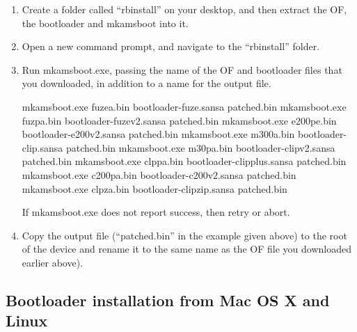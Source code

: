 \begin{enumerate}

\item Create a folder called ``rbinstall'' on your desktop, and then extract
  the OF, the bootloader and mkamsboot into it.

\item Open a new command prompt, and navigate to the ``rbinstall'' folder.

\item Run mkamsboot.exe, passing the name of the OF and bootloader files that
  you downloaded, in addition to a name for the output file.

  \begin{code}[firstline=\opt{fuze}{1}\opt{fuzev2}{2}\opt{e200v2}{3}%
            \opt{clipv1}{4}\opt{clipv2}{5}\opt{clipplus}{6}\opt{c200v2}{7}%
            \opt{clipzip}{8},%
               lastline=\opt{fuze}{1}\opt{fuzev2}{2}\opt{e200v2}{3}%
            \opt{clipv1}{4}\opt{clipv2}{5}\opt{clipplus}{6}\opt{c200v2}{7}%
            \opt{clipzip}{8}]
    mkamsboot.exe fuzea.bin bootloader-fuze.sansa patched.bin
    mkamsboot.exe fuzpa.bin bootloader-fuzev2.sansa patched.bin
    mkamsboot.exe e200pe.bin bootloader-e200v2.sansa patched.bin
    mkamsboot.exe m300a.bin bootloader-clip.sansa patched.bin
    mkamsboot.exe m30pa.bin bootloader-clipv2.sansa patched.bin
    mkamsboot.exe clppa.bin bootloader-clipplus.sansa patched.bin
    mkamsboot.exe c200pa.bin bootloader-c200v2.sansa patched.bin
    mkamsboot.exe clpza.bin bootloader-clipzip.sansa patched.bin
  \end{code}
 
  If mkamsboot.exe does not report success, then retry or abort.

\item Copy the output file (``patched.bin'' in the example given above) to the
  root of the device and rename it to the same name as the OF file you downloaded earlier 
   
   
   
    above).
\end{enumerate}

\subsection{Bootloader installation from Mac OS X and Linux}

